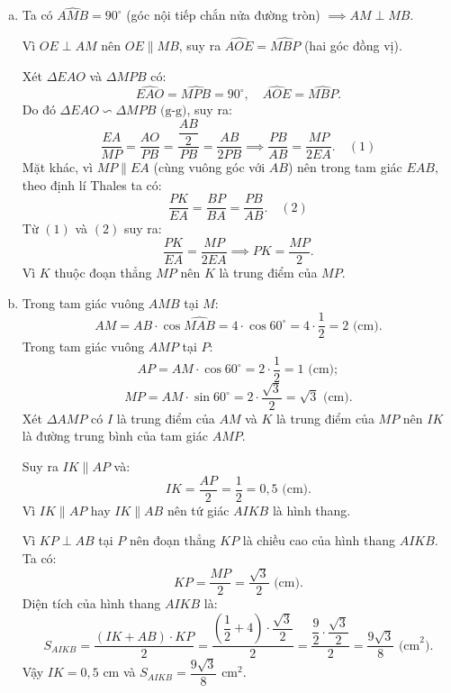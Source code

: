 \begin{bt}
{\begin{enumerate}[a)]
			Ta có $MP \perp AB$ tại $P \implies \widehat{MPA} = 90^\circ$.
			
			Ta có $MQ \perp AE$ tại $Q \implies \widehat{MQA} = 90^\circ$.
			
			Tứ giác $APMQ$ có ba góc vuông $\widehat{QAP} = \widehat{MPA} = \widehat{MQA} = 90^\circ$ nên là hình chữ nhật.
			
			Trong hình chữ nhật $APMQ$, hai đường chéo $AM$ và $PQ$ cắt nhau tại trung điểm của mỗi đường. Mà $I$ là trung điểm của $PQ$ nên $I$ cũng là trung điểm của $AM$.
			
			Lại có $EA = EM$ (tính chất hai tiếp tuyến cắt nhau) và $OA = OM = R$ nên $OE$ là đường trung trực của $AM$, suy ra $OE$ đi qua trung điểm $I$ của $AM$.
			
			Do đó ba điểm $O, E, I$ thẳng hàng.
			\item Ta có $\widehat{AMB} = 90^\circ$ (góc nội tiếp chắn nửa đường tròn) $\implies AM \perp MB$.
			
			Vì $OE \perp AM$ nên $OE \parallel MB$, suy ra $\widehat{AOE} = \widehat{MBP}$ (hai góc đồng vị).
			
			Xét $\Delta EAO$ và $\Delta MPB$ có:
			$$\widehat{EAO} = \widehat{MPB} = 90^\circ,\quad \widehat{AOE} = \widehat{MBP}.$$
			Do đó $\Delta EAO \backsim \Delta MPB\text{ (g-g)}$, suy ra:
			$$\dfrac{EA}{MP} = \dfrac{AO}{PB} = \dfrac{\dfrac{AB}{2}}{PB} = \dfrac{AB}{2PB} \implies \dfrac{PB}{AB} = \dfrac{MP}{2EA}. \quad (1)$$
			Mặt khác, vì $MP \parallel EA$ (cùng vuông góc với $AB$) nên trong tam giác $EAB$, theo định lí Thales ta có:
			$$\dfrac{PK}{EA} = \dfrac{BP}{BA} = \dfrac{PB}{AB}. \quad (2)$$
			Từ $(1)$ và $(2)$ suy ra:
			$$\dfrac{PK}{EA} = \dfrac{MP}{2EA} \implies PK = \dfrac{MP}{2}.$$
			Vì $K$ thuộc đoạn thẳng $MP$ nên $K$ là trung điểm của $MP$.
			\item Trong tam giác vuông $AMB$ tại $M$:
			$$AM = AB \cdot \cos\widehat{MAB} = 4 \cdot \cos 60^\circ = 4 \cdot \dfrac{1}{2} = 2\text{ (cm)}.$$
			Trong tam giác vuông $AMP$ tại $P$:
			$$AP = AM \cdot \cos 60^\circ = 2 \cdot \dfrac{1}{2} = 1\text{ (cm)};$$
			$$MP = AM \cdot \sin 60^\circ = 2 \cdot \dfrac{\sqrt{3}}{2} = \sqrt{3}\text{ (cm)}.$$
			Xét $\Delta AMP$ có $I$ là trung điểm của $AM$ và $K$ là trung điểm của $MP$ nên $IK$ là đường trung bình của tam giác $AMP$.
			
			Suy ra $IK \parallel AP$ và:
			$$IK = \dfrac{AP}{2} = \dfrac{1}{2} = 0{,}5\text{ (cm)}.$$
			Vì $IK \parallel AP$ hay $IK \parallel AB$ nên tứ giác $AIKB$ là hình thang.
			
			Vì $KP \perp AB$ tại $P$ nên đoạn thẳng $KP$ là chiều cao của hình thang $AIKB$. Ta có:
			$$KP = \dfrac{MP}{2} = \dfrac{\sqrt{3}}{2}\text{ (cm)}.$$
			Diện tích của hình thang $AIKB$ là:
			$$S_{AIKB} = \dfrac{(IK + AB) \cdot KP}{2} = \dfrac{\left(\dfrac{1}{2} + 4\right) \cdot \dfrac{\sqrt{3}}{2}}{2} = \dfrac{\dfrac{9}{2} \cdot \dfrac{\sqrt{3}}{2}}{2} = \dfrac{9\sqrt{3}}{8}\text{ (cm}^2).$$
			Vậy $IK = 0{,}5\text{ cm}$ và $S_{AIKB} = \dfrac{9\sqrt{3}}{8}\text{ cm}^2$.
		\end{enumerate}
}
\end{bt}


